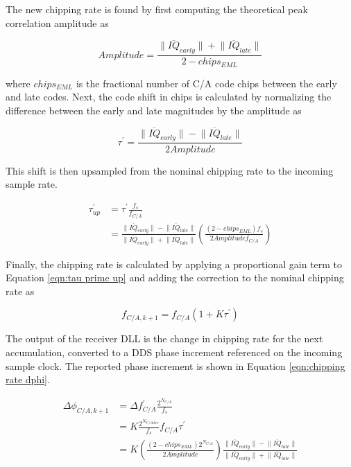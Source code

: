 \documentclass[12pt]{article}
\begin{document}
The new chipping rate is found by first computing the theoretical peak correlation amplitude as

\begin{equation}
Amplitude = \frac{\lVert \overline{IQ}_{early} \rVert + \lVert \overline{IQ}_{late} \rVert}{2-chips_{EML}}
\end{equation}

where $chips_{EML}$ is the fractional number of C/A code chips between the early and late codes. Next, the code shift in chips is calculated by normalizing the difference between the early and late magnitudes by the amplitude as

\begin{equation*}
\tau^\prime = \frac{\lVert \overline{IQ}_{early} \rVert - \lVert \overline{IQ}_{late} \rVert}{2 Amplitude}
\end{equation*}

This shift is then upsampled from the nominal chipping rate to the incoming sample rate.

\begin{align}
\label{eqn:tau prime up}
\tau^\prime_{up} &= \tau^\prime \frac{f_{s}}{f_{C/A}} \nonumber \\
&= \frac{\lVert \overline{IQ}_{early} \rVert - \lVert \overline{IQ}_{late} \rVert}{\lVert \overline{IQ}_{early} \rVert + \lVert \overline{IQ}_{late} \rVert} \left( \frac{(2-chips_{EML})f_s}{2 Amplitude f_{C/A}} \right)
\end{align}

Finally, the chipping rate is calculated by applying a proportional gain term to Equation \ref{eqn:tau prime up} and adding the correction to the nominal chipping rate as

\begin{equation*}
f_{C/A,k+1} = f_{C/A}(1+K \tau^\prime)
\end{equation*}

The output of the receiver DLL is the change in chipping rate for the next accumulation, converted to a DDS phase increment referenced on the incoming sample clock. The reported phase increment is shown in Equation \ref{eqn:chipping rate dphi}.

\begin{align}
\label{eqn:chipping rate dphi}
\Delta\phi_{C/A,k+1} &= \Delta f_{C/A}^\prime \frac{2^{N_{C/A}}}{f_s} \nonumber \\
&= K \frac{2^{N_{C/A Acc}}}{f_s} f_{C/A} \tau^\prime \nonumber \\
&= K \left( \frac{(2-chips_{EML}) 2^{N_{C/A}}}{2 Amplitude} \right) \frac{\lVert \overline{IQ}_{early} \rVert - \lVert \overline{IQ}_{late} \rVert}{\lVert \overline{IQ}_{early} \rVert + \lVert \overline{IQ}_{late} \rVert}
\end{align}
\end{document}
